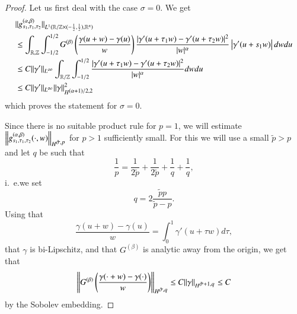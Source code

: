 \begin{proof}
 Let us first deal with the case $\sigma =0$. We get
 \begin{align*}
  &\|g^{(\a,\beta)}_{s_1, \tau_1, \tau_2}\|_{L^1 (\mathbb R / \mathbb Z\times(-\frac12,\frac12), \mathbb R^n)} \\
  &\leq 
  \int_{\mathbb R, \mathbb Z}  \int_{-1/2}^{1/2} G^{(\beta)}\left(\frac {\gamma(u+w) - \gamma(u)}{w} \right) 
  \frac{|\gamma'(u+\tau_1 w) - \gamma'(u+\tau_2 w)|^2}{|w|^\alpha} \abs{\gamma'(u+s_1 w)}  dw du 
  \\
  & \leq C \|\gamma'\|_{\Lp[\infty]} \int_{\mathbb R / \mathbb Z} \int_{-1/2}^{1/2}
     \frac{|\gamma'(u+\tau_1 w) - \gamma'(u+\tau_2 w)|^2}{|w|^\alpha}
    dw du
  \\
  & \leq C \|\gamma'\|_{\Lp[\infty]} \|\gamma\|_{\W[(\a+1)/2,2]}^2
 \end{align*}
  which proves the statement for $\sigma =0$.

 Since there is no suitable 
 product rule for $p=1$, we will
 estimate $\norm{g^{(\a,\beta)}_{s_1, \tau_1, \tau_2}(\cdot,w)}_{\W[\tilde \sigma,p]}$ for $p>1$ sufficiently small.
 For this we will use a small $\tilde p > p$ and let $q$
 be such that 
 \begin{equation*}
  \frac 1 p = \frac 1 {2\tilde p} +  \frac 1 {2\tilde p} + \frac 1 q + \frac 1 q,
 \end{equation*}
 i.~e.\@ we set
 \begin{equation*}
  q = 2 \frac {\tilde p p} {\tilde p -p}.
 \end{equation*}
Using that
\begin{equation*}
 \frac {\gamma(u+w)-\gamma(u)} {w} = \int_{0}^1 \gamma'(u+\tau w) d\tau,
\end{equation*}
that $\gamma$ is bi-Lipschitz, and that $G^{(\beta)}$ is analytic away from the origin, 
we get that
\begin{equation*}
 \left\|G^{(\beta)}\left(\frac {\gamma(\cdot +w)-\gamma(\cdot)}{w}\right)\right\|_{\W[\tilde\sigma,q]}
 \leq C \|\gamma\|_{\W[ \tilde \sigma +1,q]}
  \leq C
\end{equation*}
by the Sobolev embedding.


\end{proof}
